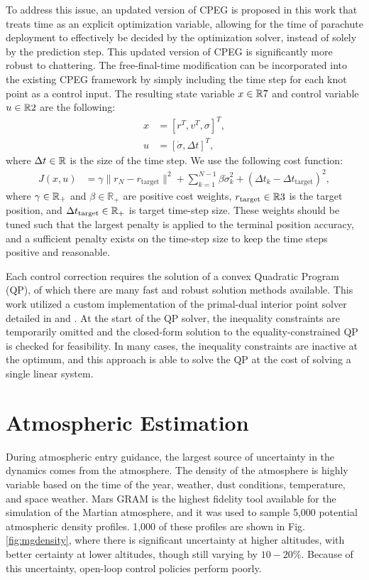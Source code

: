  To address this issue, an updated version of CPEG is proposed in this work that treats time as an explicit optimization variable, allowing for the time of parachute deployment to effectively be decided by the optimization solver, instead of solely by the prediction step. This updated version of CPEG is significantly more robust to chattering. The free-final-time modification can be incorporated into the existing CPEG framework by simply including the time step for each knot point as a control input. The resulting state variable $x \in \mathbb{R}{7}$ and control variable $u \in \mathbb{R}{2}$ are the following:
\begin{align}
    x &= [r^T, v^T, \sigma]^T, \\ 
    u &= [\dot{\sigma}, \Delta t]^T,
\end{align}
where $\Delta t \in \mathbb{R}{}$ is the size of the time step. We use the following cost function:
\begin{align}
    J(x,u) &= \gamma \|r_N - r_\text{target}\|^2 + \sum_{k=1}^{N-1} \beta \dot{\sigma}_k^2  + (\Delta t_k - \Delta t_\text{target})^2 ,
\end{align}
where $\gamma \in \mathbb{R}{}_+$ and $\beta \in \mathbb{R}_+$ are positive cost weights, $r_\text{target} \in \mathbb{R}{3}$ is the target position, and $\Delta t_\text{target} \in \mathbb{R}{}_+$ is target time-step size. These weights should be tuned such that the largest penalty is applied to the terminal position accuracy, and a sufficient penalty exists on the time-step size to keep the time steps positive and reasonable.

Each control correction requires the solution of a convex Quadratic Program (QP), of which there are many fast and robust solution methods available. This work utilized a custom implementation of the primal-dual interior point solver detailed in \cite{mattingley2012} and \cite{vandenberghe}. At the start of the QP solver, the inequality constraints are temporarily omitted and the closed-form solution to the equality-constrained QP is checked for feasibility. In many cases, the inequality constraints are inactive at the optimum, and this approach is able to solve the QP at the cost of solving a single linear system. 
\section{Atmospheric Estimation}\label{section5}
During atmospheric entry guidance, the largest source of uncertainty in the dynamics comes from the atmosphere. The density of the atmosphere is highly variable based on the time of the year, weather, dust conditions, temperature, and space weather. Mars GRAM \cite{justh2013} is the highest fidelity tool available for the simulation of the Martian atmosphere, and it was used to sample 5,000 potential atmospheric density profiles. 1,000 of these profiles are shown in Fig. \ref{fig:mgdensity}, where there is significant uncertainty at higher altitudes, with better certainty at lower altitudes, though still varying by $10-20\%$. Because of this uncertainty, open-loop control policies perform poorly. 

